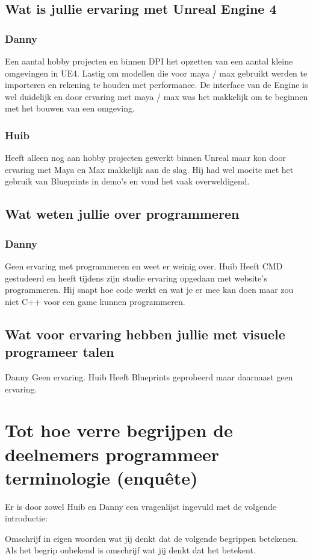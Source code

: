 \subsection*{Wat is jullie ervaring met Unreal Engine 4}
\subsubsection*{Danny}
Een aantal hobby projecten en binnen DPI het opzetten van een aantal kleine omgevingen in UE4. Lastig om modellen die voor maya / max gebruikt werden te importeren en rekening te houden met performance. De interface van de Engine is wel duidelijk en door ervaring met maya / max was het makkelijk om te beginnen met het bouwen van een omgeving.
\subsubsection*{Huib}
Heeft alleen nog aan hobby projecten gewerkt binnen Unreal maar kon door ervaring met Maya en Max makkelijk aan de slag. Hij had wel moeite met het gebruik van Blueprints in demo’s en vond het vaak overweldigend.
\subsection*{Wat weten jullie over programmeren}
\subsubsection*{Danny}
Geen ervaring met programmeren en weet er weinig over.
Huib
Heeft CMD gestudeerd en heeft tijdens zijn studie ervaring opgedaan met website’s programmeren. Hij snapt hoe code werkt en wat je er mee kan doen maar zou niet C++ voor een game kunnen programmeren.
\subsection*{Wat voor ervaring hebben jullie met visuele programeer talen}
Danny
Geen ervaring.
Huib
Heeft Blueprints geprobeerd maar daarnaast geen ervaring.

\section[Enquête]{Tot hoe verre begrijpen de deelnemers programmeer terminologie (enquête)}
\label{appendix:oreintatieintervieuw:enquete}
Er is door zowel Huib en Danny een vragenlijst ingevuld met de volgende introductie:

Omschrijf in eigen woorden wat jij denkt dat de volgende begrippen betekenen. Als het begrip onbekend is omschrijf wat jij denkt dat het betekent.

